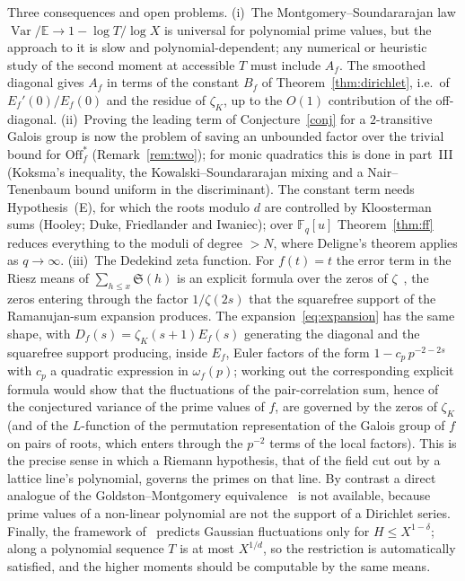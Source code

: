 \documentclass[11pt,a4paper]{article}
\theoremstyle{remark}\newtheorem{remark}[theorem]{Remark}
\newcommand{\F}{\mathbb{F}}
\newcommand{\Var}{\operatorname{Var}}
\newcommand{\E}{\mathbb{E}}
\newcommand{\Sig}{\mathfrak S}
\begin{document}
Three consequences and open problems. (i)~The Montgomery--Soundararajan law $\Var/\E\to1-\log T/\log X$
is universal for polynomial prime values, but the approach to it is slow and polynomial-dependent;
any numerical or heuristic study of the second moment at accessible $T$ must include $A_f$. The
smoothed diagonal gives $A_f$ in terms of the constant $B_f$ of Theorem~\ref{thm:dirichlet}, i.e.\ of
$E_f'(0)/E_f(0)$ and the residue of $\zeta_K$, up to the $O(1)$ contribution of the off-diagonal.
(ii)~Proving the leading term of Conjecture~\ref{conj} for a $2$-transitive Galois group is now the
problem of saving an unbounded factor over the trivial bound for $\mathrm{Off}^\ast_f$
(Remark~\ref{rem:two}); for monic quadratics this is done in part~III (Koksma's inequality, the Kowalski--Soundararajan
mixing and a Nair--Tenenbaum bound uniform in the discriminant). The constant term needs Hypothesis~(E), for which the
roots modulo $d$ are controlled by Kloosterman sums (Hooley; Duke, Friedlander and Iwaniec); over $\F_q[u]$ Theorem~\ref{thm:ff} reduces everything to the moduli of degree $>N$, where
Deligne's theorem applies as $q\to\infty$. (iii)~The Dedekind zeta function. For $f(t)=t$ the
error term in the Riesz means of $\sum_{h\le x}\Sig(h)$ is an explicit formula over the zeros of
$\zeta$~\cite{GoldstonSuriajaya2021}, the zeros entering through the factor $1/\zeta(2s)$ that the
squarefree support of the Ramanujan-sum expansion produces. The expansion~\eqref{eq:expansion} has the
same shape, with $D_f(s)=\zeta_K(s+1)E_f(s)$ generating the diagonal and the squarefree support
producing, inside $E_f$, Euler factors of the form $1-c_p\,p^{-2-2s}$ with $c_p$ a quadratic expression
in $\omega_f(p)$; working out the corresponding explicit formula would show that the fluctuations of the pair-correlation sum, hence
of the conjectured variance of the prime values of $f$, are governed by the zeros of $\zeta_K$ (and of
the $L$-function of the permutation representation of the Galois group of $f$ on pairs of roots, which
enters through the $p^{-2}$ terms of the local factors). This is the precise sense in which a Riemann
hypothesis, that of the field cut out by a lattice line's polynomial, governs the primes on that line.
By contrast a direct analogue of the Goldston--Montgomery equivalence~\cite{GoldstonMontgomery1987} is
not available, because prime values of a non-linear polynomial are not the support of a Dirichlet
series. Finally, the framework
of~\cite{MontgomerySoundararajan2004} predicts Gaussian fluctuations only for $H\le X^{1-\delta}$; along
a polynomial sequence $T$ is at most $X^{1/d}$, so the restriction is automatically satisfied, and the
higher moments should be computable by the same means.
\end{document}
